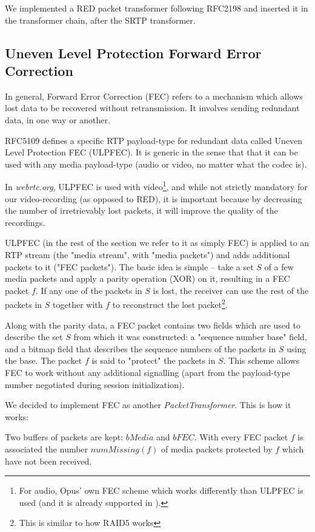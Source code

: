 \documentclass[twoside,openright,a4paper,12pt,english]{article}
\begin{document}
We implemented a RED packet transformer following RFC2198 and inserted it in
the transformer chain, after the SRTP transformer.




\subsection{Uneven Level Protection Forward Error Correction}
\label{ulpfec}
In general, Forward Error Correction (FEC) refers to a mechanism which allows
lost data to be recovered without retransmission. It involves sending redundant
data, in one way or another.

RFC5109\cite{ulpfec} defines a specific RTP payload-type for
redundant data called Uneven Level Protection FEC (ULPFEC). It is generic in
the sense that that it can be used with any media payload-type
(audio or video, no matter what the codec is). 

In \emph{webrtc.org},
ULPFEC is used with video\footnote{For audio, Opus' own FEC scheme which works
differently than ULPFEC is used (and it is already supported in \lj).},
and while not strictly mandatory for our video-recording (as opposed to RED),
it is important because by decreasing the number of irretrievably lost packets,
it will improve the quality of the recordings.

ULPFEC (in the rest of the section we refer to it as simply FEC) is applied to
an RTP stream (the "media stream", with "media packets")
and adds additional packets to it ("FEC packets"). The basic idea is simple --
take a set $S$ of a few media packets and apply a parity operation (XOR) on it,
resulting in a FEC packet $f$. If any one of the packets in $S$ is lost,
the receiver can use the rest of the packets in $S$ together with $f$ to reconstruct the
lost packet\footnote{This is similar to how RAID5 works}. 

Along with the parity data, a FEC packet contains two fields which are used to
describe the set $S$ from which it was constructed: a "sequence number base"
field, and a bitmap field that describes the sequence numbers of the packets in
$S$ using the base. The packet $f$ is said to "protect" the packets in $S$. This scheme 
allows FEC to work without any additional
signalling (apart from the payload-type number negotiated during session
initialization). 

\medskip
We decided to implement FEC as another \emph{PacketTransformer}. This is how it works:

Two buffers of packets are kept: $bMedia$ and $bFEC$. With every FEC packet $f$
is associated the number $numMissing(f)$ of media packets protected by $f$
which have not been received.
\end{document}
